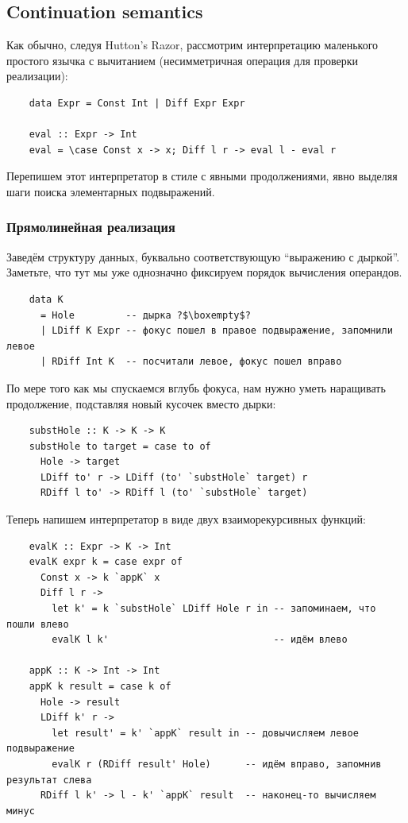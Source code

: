 \subsection{Continuation semantics} \label{subsec:definctionalized-cont}

Как обычно, следуя Hutton's Razor, рассмотрим интерпретацию маленького простого язычка с вычитанием (несимметричная операция для проверки реализации):
\begin{verbatim}
    data Expr = Const Int | Diff Expr Expr

    eval :: Expr -> Int
    eval = \case Const x -> x; Diff l r -> eval l - eval r
\end{verbatim}

Перепишем этот интерпретатор в стиле с явными продолжениями, явно выделяя шаги поиска элементарных подвыражений.


\subsubsection{Прямолинейная реализация}

Заведём структуру данных, буквально соответствующую ``выражению с дыркой''.
Заметьте, что тут мы уже однозначно фиксируем порядок вычисления операндов.
\begin{verbatim}
    data K
      = Hole         -- дырка ?$\boxempty$?
      | LDiff K Expr -- фокус пошел в правое подвыражение, запомнили левое
      | RDiff Int K  -- посчитали левое, фокус пошел вправо
\end{verbatim}

По мере того как мы спускаемся вглубь фокуса, нам нужно уметь наращивать продолжение, подставляя новый кусочек вместо дырки:
\begin{verbatim}
    substHole :: K -> K -> K
    substHole to target = case to of
      Hole -> target
      LDiff to' r -> LDiff (to' `substHole` target) r
      RDiff l to' -> RDiff l (to' `substHole` target)
\end{verbatim}

Теперь напишем интерпретатор в виде двух взаиморекурсивных функций:
\begin{verbatim}
    evalK :: Expr -> K -> Int
    evalK expr k = case expr of
      Const x -> k `appK` x
      Diff l r ->
        let k' = k `substHole` LDiff Hole r in -- запоминаем, что пошли влево
        evalK l k'                             -- идём влево

    appK :: K -> Int -> Int
    appK k result = case k of
      Hole -> result
      LDiff k' r ->
        let result' = k' `appK` result in -- довычисляем левое подвыражение
        evalK r (RDiff result' Hole)      -- идём вправо, запомнив результат слева
      RDiff l k' -> l - k' `appK` result  -- наконец-то вычисляем минус
\end{verbatim}

